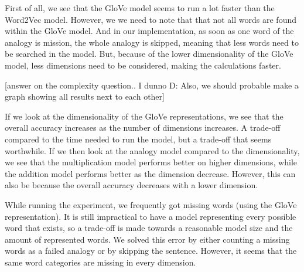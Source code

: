 First of all, we see that the GloVe model seems to run a lot faster than the Word2Vec model. However, we we need to note that that not all words are found within the GloVe model. And in our implementation, as soon as one word of the analogy is mission, the whole analogy is skipped, meaning that less words need to be searched in the model. But, because of the lower dimensionality of the GloVe model, less dimensions need to be considered, making the calculations faster.

[answer on the complexity question.. I dunno D:
 Also, we should probable make a graph showing all results next to each other]

If we look at the dimensionality of the GloVe representations, we see that the overall accuracy increases as the number of dimensions increases. A trade-off compared to the time needed to run the model, but a trade-off that seems worthwhile. 
If we then look at the analogy model compared to the dimensionality, we see that the multiplication model performs better on higher dimensions, while the addition model performs better as the dimension decrease. However, this can also be because the overall accuracy decreases with a lower dimension.

While running the experiment, we frequently got missing words (using the GloVe representation). It is still impractical to have a model representing every possible word that exists, so a trade-off is made towards a reasonable model size and the amount of represented words. We solved this error by either counting a missing words as a failed analogy or by skipping the sentence. However, it seems that the same word categories are missing in every dimension.

